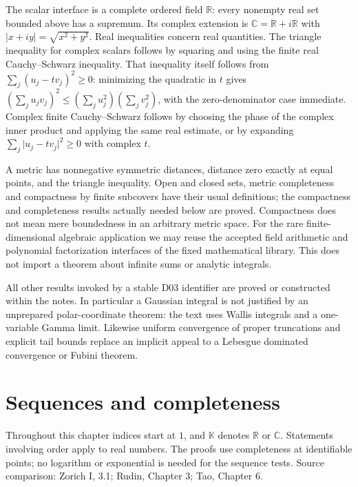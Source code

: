 \documentclass[11pt,oneside,a4paper]{book}
\theoremstyle{definition}
\theoremstyle{remark}
\newcommand{\R}{\mathbb R}
\newcommand{\C}{\mathbb C}
\newcommand{\K}{\mathbb K}
\newcommand{\abs}[1]{\lvert#1\rvert}
\newcommand{\SourceRef}[1]{{\small\textsf{Source comparison: #1.}}}
\begin{document}
The scalar interface is a complete ordered field $\R$: every nonempty real set
bounded above has a supremum. Its complex extension is $\C=\R+i\R$ with
$\abs{x+iy}=\sqrt{x^2+y^2}$. Real inequalities concern real quantities. The
triangle inequality for complex scalars follows by squaring and using the finite
real Cauchy--Schwarz inequality. That inequality itself follows from
$\sum_j(u_j-tv_j)^2\geq0$: minimizing the quadratic in $t$ gives
$(\sum_j u_jv_j)^2\leq(\sum_j u_j^2)(\sum_jv_j^2)$, with the zero-denominator
case immediate. Complex finite Cauchy--Schwarz follows by choosing the phase of
the complex inner product and applying the same real estimate, or by expanding
$\sum_j\abs{u_j-tv_j}^2\geq0$ with complex $t$.

A metric has nonnegative symmetric distances, distance zero exactly at equal
points, and the triangle inequality. Open and closed sets, metric completeness
and compactness by finite subcovers have their usual definitions; the compactness
and completeness results actually needed below are proved. Compactness does not
mean mere boundedness in an arbitrary metric space. For the rare finite-dimensional
algebraic application we may reuse the accepted field arithmetic and polynomial
factorization interfaces of the fixed mathematical library. This does not import
a theorem about infinite sums or analytic integrals.

All other results invoked by a stable D03 identifier are proved or constructed
within the notes. In particular a Gaussian integral is not justified by an
unprepared polar-coordinate theorem: the text uses Wallis integrals and a
one-variable Gamma limit. Likewise uniform convergence of proper truncations
and explicit tail bounds replace an implicit appeal to a Lebesgue dominated
convergence or Fubini theorem.



\chapter{Sequences and completeness}
Throughout this chapter indices start at $1$, and $\K$ denotes $\R$ or $\C$. Statements involving order apply to real numbers. The proofs use completeness at identifiable points; no logarithm or exponential is needed for the sequence tests.
\SourceRef{Zorich I, 3.1; Rudin, Chapter 3; Tao, Chapter 6}
\end{document}
